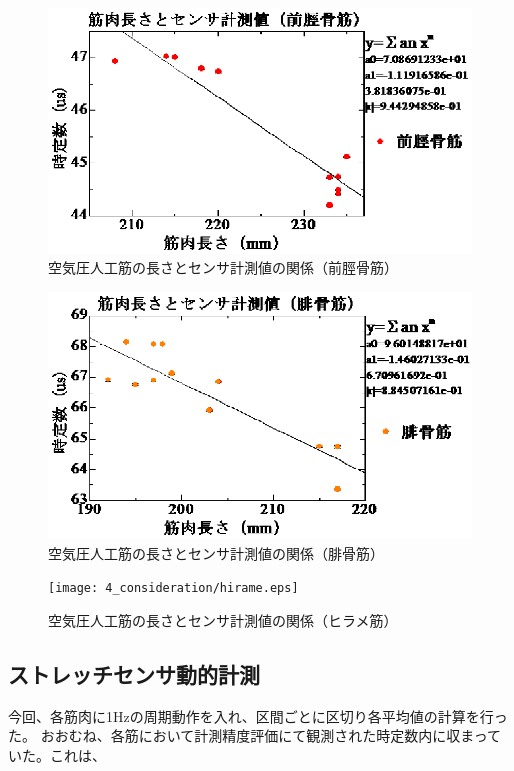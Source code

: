 \begin{figure}[h]
    \begin{center}
        \includegraphics[width=0.78\columnwidth,clip]{4_consideration/zenkei.eps}
    \end{center}
    \caption{空気圧人工筋の長さとセンサ計測値の関係（前脛骨筋）}
    \label{ml-rc1}
\end{figure}

\begin{figure}[h]
    \begin{center}
        \includegraphics[width=0.78\columnwidth,clip]{4_consideration/hikotsu.eps}
    \end{center}
    \caption{空気圧人工筋の長さとセンサ計測値の関係（腓骨筋）}
    \label{ml-rc2}
\end{figure}

\begin{figure}[h]
    \begin{center}
        \texttt{[image: 4\_consideration/hirame.eps]}
    \end{center}
    \caption{空気圧人工筋の長さとセンサ計測値の関係（ヒラメ筋）}
    \label{ml-rc3}
\end{figure}

\subsection{ストレッチセンサ動的計測}
今回、各筋肉に1Hzの周期動作を入れ、区間ごとに区切り各平均値の計算を行った。
おおむね、各筋において計測精度評価にて観測された時定数内に収まっていた。これは、
